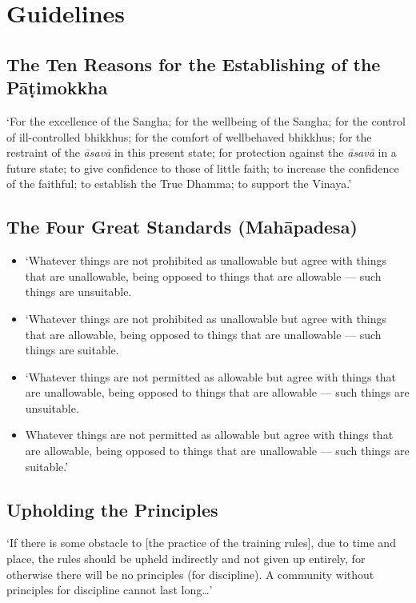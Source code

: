 \chapter{Guidelines}

\section{The Ten Reasons for the Establishing of the Pāṭimokkha}

`For the excellence of the Sangha; for the wellbeing of the Sangha; for the
control of ill-controlled bhikkhus; for the comfort of wellbehaved bhikkhus; for
the restraint of the \emph{āsavā} in this present state; for protection against
the \emph{āsavā} in a future state; to give confidence to those of little faith;
to increase the confidence of the faithful; to establish the True Dhamma; to
support the Vinaya.'


\section{The Four Great Standards (Mahāpadesa)}

\begin{itemize}

\item `Whatever things are not prohibited as unallowable but agree with things
  that are unallowable, being opposed to things that are allowable — such things
  are unsuitable.

\item `Whatever things are not prohibited as unallowable but agree with things
  that are allowable, being opposed to things that are unallowable — such things
  are suitable.

\item `Whatever things are not permitted as allowable but agree with things that
  are unallowable, being opposed to things that are allowable — such things are
  unsuitable.

\item Whatever things are not permitted as allowable but agree with things that
are allowable, being opposed to things that are unallowable — such things are suitable.'

\end{itemize}


\section{Upholding the Principles}

`If there is some obstacle to [the practice of the training rules], due to time
and place, the rules should be upheld indirectly and not given up entirely, for
otherwise there will be no principles (for discipline). A community without
principles for discipline cannot last long\ldots{}'


